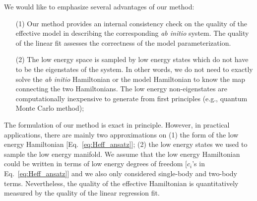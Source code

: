 We would like to emphasize several advantages of our method: 
\begin{itemize}
\item [(1)] Our method provides an internal consistency check on the quality of the effective model in describing the corresponding \textit{ab initio} system. The quality of the linear fit assesses the correctness of the model parameterization. 
\item [(2)] The low energy space is sampled by low energy states which do not have to be the eigenstates of the system. In other words, we do not need to exactly solve the \textit{ab initio} Hamiltonian or the model Hamiltonian to know the map connecting the two Hamiltonians. The low energy non-eigenstates are computationally inexpensive to generate from first principles (e.g., quantum Monte Carlo method); 
\end{itemize}
The formulation of our method is exact in principle. However, in practical applications, there are mainly two approximations on (1) the form of the low energy Hamiltonian [Eq.~\eqref{eq:Heff_ansatz}]; (2) the low energy states we used to sample the low energy manifold. We assume that the low energy Hamiltonian could be written in terms of low energy degrees of freedom [$c_i$'s in Eq.~\eqref{eq:Heff_ansatz}] and we also only considered single-body and two-body terms. Nevertheless, the quality of the effective Hamiltonian is quantitatively measured by the quality of the linear regression fit.
